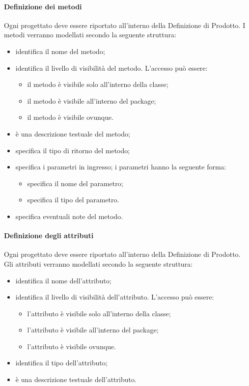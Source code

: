 \paragraph{Definizione dei metodi}
Ogni  progettato deve essere riportato all'interno della Definizione di Prodotto. I metodi verranno modellati secondo la seguente struttura:
\begin{itemize}
\item {}identifica il nome del metodo;
\item {}identifica il livello di visibilità del metodo. L'accesso può essere:
\begin{itemize}
\item {}il metodo è visibile solo all'interno della classe;
\item {}il metodo è visibile all'interno del package;
\item {}il metodo è visibile ovunque.
\end{itemize}
\item {}è una descrizione testuale del metodo;
\item {}specifica il tipo di ritorno del metodo;
\item {}specifica i parametri in ingresso; i parametri hanno la seguente forma:
\begin{itemize}
\item {}specifica il nome del parametro;
\item {}specifica il tipo del parametro.
\end{itemize}
\item {}specifica eventuali note del metodo.
\end{itemize}

\paragraph{Definizione degli attributi}
Ogni  progettato deve essere riportato all'interno della Definizione di Prodotto. Gli attributi verranno modellati secondo la seguente struttura:
\begin{itemize}
\item {}identifica il nome dell'attributo;
\item {}identifica il livello di visibilità dell'attributo. L'accesso può essere:
\begin{itemize}
\item {}l'attributo è visibile solo all'interno della classe;
\item {}l'attributo è visibile all'interno del package;
\item {}l'attributo è visibile ovunque.
\end{itemize}
\item {}identifica il tipo dell'attributo;
\item {}è una descrizione testuale dell'attributo.
\end{itemize}

